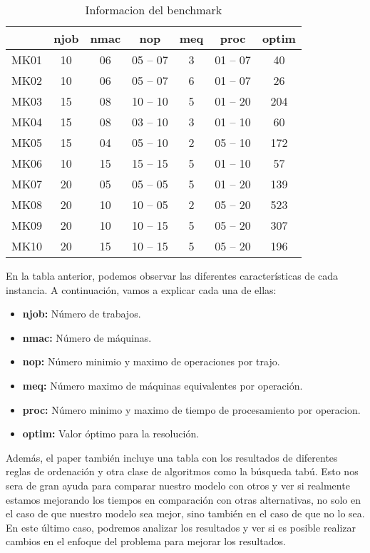 \begin{table}[ht]
    \centering
    \begin{tabular}[ht]{c|ccccc|c} 
                  & njob & nmac & nop & meq & proc & optim \\
        \hline 
        MK01      & 10  & 06    & 05 -- 07  & 3  & 01 -- 07  & 40\\
        MK02      & 10  & 06    & 05 -- 07  & 6  & 01 -- 07  & 26\\
        MK03      & 15  & 08    & 10 -- 10  & 5  & 01 -- 20  & 204\\
        MK04      & 15  & 08    & 03 -- 10  & 3  & 01 -- 10  & 60\\
        MK05      & 15  & 04    & 05 -- 10  & 2  & 05 -- 10  & 172\\
        MK06      & 10  & 15    & 15 -- 15  & 5  & 01 -- 10  & 57\\
        MK07      & 20  & 05    & 05 -- 05  & 5  & 01 -- 20  & 139\\
        MK08      & 20  & 10    & 10 -- 05  & 2  & 05 -- 20  & 523\\
        MK09      & 20  & 10    & 10 -- 15  & 5  & 05 -- 20  & 307\\
        MK10      & 20  & 15    & 10 -- 15  & 5  & 05 -- 20  & 196\\
    \end{tabular}
    \caption{Informacion del benchmark}
\end{table}

En la tabla anterior, podemos observar las diferentes características de cada instancia. A continuación,
vamos a explicar cada una de ellas:
\begin{itemize}
    \item \textbf{njob:} Número de trabajos.
    \item \textbf{nmac:} Número de máquinas.
    \item \textbf{nop:} Número minimio y maximo de operaciones por trajo.
    \item \textbf{meq:} Número maximo de máquinas equivalentes por operación.
    \item \textbf{proc:} Número minimo y maximo de tiempo de procesamiento por operacion.
    \item \textbf{optim:} Valor óptimo para la resolución.
\end{itemize} 

Además, el paper \cite*{pbrandimarte} también incluye una tabla con los resultados de diferentes
reglas de ordenación y otra clase de algoritmos como la búsqueda tabú. Esto nos sera de gran ayuda
para comparar nuestro modelo con otros y ver si realmente estamos mejorando los tiempos en
comparación con otras alternativas, no solo en el caso de que nuestro modelo sea mejor, sino también
en el caso de que no lo sea. En este último caso, podremos analizar los resultados y ver si es posible
realizar cambios en el enfoque del problema para mejorar los resultados.